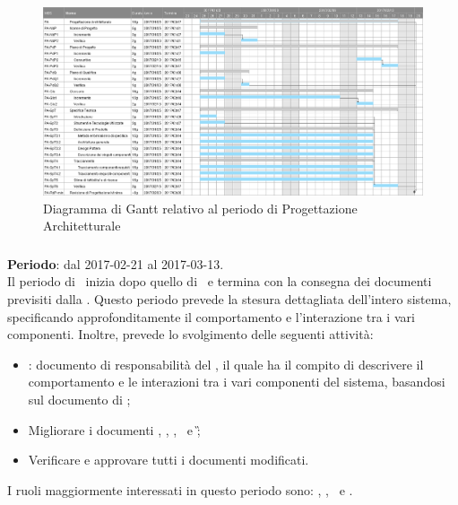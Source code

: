 		\begin{figure}[ht]
			\centering
			\includegraphics[scale=0.34]{img/ganttnetbreak2.png}
			\caption{Diagramma di Gantt relativo al periodo di Progettazione Architetturale}
		\end{figure}
		\FloatBarrier
	
		\subsubsection{\PD}
		\textbf{Periodo}: dal 2017-02-21 al 2017-03-13.\\
		Il periodo di \PD\ inizia dopo quello di \PA\ e termina con la consegna dei documenti previsiti dalla \RP. Questo periodo prevede la stesura dettagliata dell’intero sistema, specificando approfonditamente
		il comportamento e l’interazione tra i vari componenti.
		Inoltre, prevede lo svolgimento delle seguenti attività:
		\begin{itemize}
			\item \textit{\DDP}: documento di responsabilità del \Prog, il quale ha il compito di descrivere il comportamento	e le interazioni tra i vari componenti del sistema, basandosi sul documento di \ST;
			\item  Migliorare i documenti \NdP, \PdP, \PdQ, \ST\ e \G;
			\item Verificare e approvare tutti i documenti modificati.
		\end{itemize}
		I ruoli maggiormente interessati in questo periodo sono: \Amm, \Res, \Prog\ e \Ver.
		
